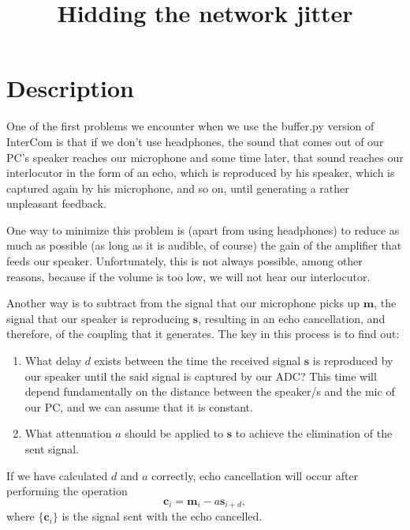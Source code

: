 
\title{Hidding the network jitter}

\maketitle

\section{Description}


One of the first problems we encounter when we use the buffer.py
version of InterCom is that if we don't use headphones, the sound that
comes out of our PC's speaker reaches our microphone and some time
later, that sound reaches our interlocutor in the form of an echo,
which is reproduced by his speaker, which is captured again by his
microphone, and so on, until generating a rather unpleasant feedback.

One way to minimize this problem is (apart from using headphones) to
reduce as much as possible (as long as it is audible, of course) the
gain of the amplifier that feeds our speaker. Unfortunately, this is
not always possible, among other reasons, because if the volume is too
low, we will not hear our interlocutor.

Another way is to subtract from the signal that our microphone picks
up ${\mathbf m}$, the signal that our speaker is reproducing
${\mathbf s}$, resulting in an echo cancellation, and therefore, of
the coupling that it generates. The key in this process is to find
out:

\begin{enumerate}
\item What delay $d$ exists between the time the received signal
  ${\mathbf s}$ is reproduced by our speaker until the said signal is
  captured by our ADC? This time will depend fundamentally on the
  distance between the speaker/s and the mic of our PC, and we can
  assume that it is constant.

\item What attenuation $a$ should be applied to ${\mathbf s}$ to
  achieve the elimination of the sent signal.
\end{enumerate}

If we have calculated $d$ and $a$ correctly, echo cancellation will
occur after performing the operation
\begin{equation}
   {\mathbf c}_i = {\mathbf m}_i - a{\mathbf s}_{i+d},
\end{equation}
where $\{{\mathbf c}_i\}$ is the signal sent with the echo cancelled.

